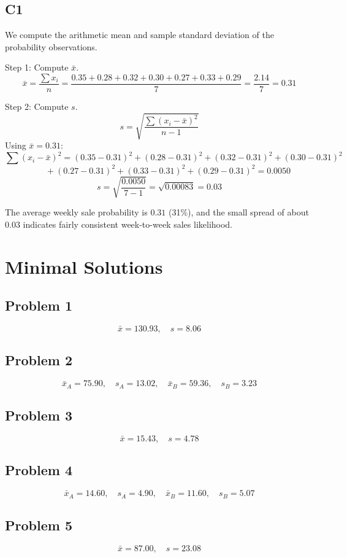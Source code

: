\begin{ExamProblems}
		\subsection*{C1}
		We compute the arithmetic mean and sample standard deviation of the probability observations.

		Step 1: Compute $\bar{x}$.
		\[
		\bar{x} = \frac{\sum x_i}{n}
		= \frac{0.35+0.28+0.32+0.30+0.27+0.33+0.29}{7}
		= \frac{2.14}{7}
		= 0.31
		\]

		Step 2: Compute $s$.
		\[
		s = \sqrt{\frac{\sum (x_i-\bar{x})^2}{n-1}}
		\]
		Using $\bar{x}=0.31$:
		\[
		\sum (x_i-\bar{x})^2 = (0.35-0.31)^2+(0.28-0.31)^2+(0.32-0.31)^2+(0.30-0.31)^2
		\]
		\[
		\qquad +(0.27-0.31)^2+(0.33-0.31)^2+(0.29-0.31)^2 = 0.0050
		\]
		\[
		s = \sqrt{\frac{0.0050}{7-1}} = \sqrt{0.00083} = 0.03
		\]

		The average weekly sale probability is $0.31$ (31\%), and the small spread of about $0.03$ indicates fairly consistent week-to-week sales likelihood.

	\end{ExamProblems}

\section{Minimal Solutions}
\subsection*{Problem 1}
\[
\bar{x}=130.93,\quad s=8.06
\]

\subsection*{Problem 2}
\[
\bar{x}_A=75.90,\quad s_A=13.02,\quad \bar{x}_B=59.36,\quad s_B=3.23
\]

\subsection*{Problem 3}
\[
\bar{x}=15.43,\quad s=4.78
\]

\subsection*{Problem 4}
\[
\bar{x}_A=14.60,\quad s_A=4.90,\quad \bar{x}_B=11.60,\quad s_B=5.07
\]

\subsection*{Problem 5}
\[
\bar{x}=87.00,\quad s=23.08
\]

